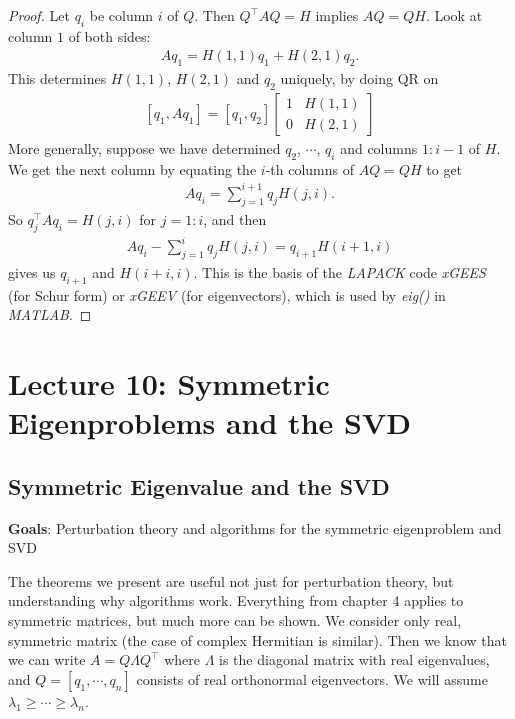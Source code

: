 \documentclass[11pt]{article}
\numberwithin{equation}{section}
\begin{document}
\begin{proof}
    Let $q_i$ be column $i$ of $Q$. Then $Q^{\top}AQ=H$ implies $AQ = QH$. Look at column $1$ of both sides: \begin{align*}
        Aq_1 = H(1,1)q_1 + H(2,1)q_2.
    \end{align*}
    This determines $H(1,1)$, $H(2,1)$ and $q_2$ uniquely, by doing QR on \begin{align*}
        \left[ q_1,Aq_1 \right] = \left[ q_1, q_2 \right] \left[\begin{array}{ll}
            1 & H(1,1) \\
            0 & H(2,1)
            \end{array}\right]
    \end{align*}
    More generally, suppose we have determined $q_2$, $\cdots$, $q_i$ and columns $1:i-1$ of $H$. 
    We get the next column by equating the $i$-th columns of $AQ=QH$ to get \begin{align*}
        Aq_i = \sum_{j=1}^{i+1} q_jH(j,i).
    \end{align*}
    So $q_j^{\top}Aq_i = H(j,i)$ for $j=1:i$, and then \begin{align*}
        Aq_i - \sum_{j=1}^{i} q_jH(j,i) = q_{i+1} H(i+1,i)
    \end{align*}
    gives us $q_{i+1}$ and $H(i+i,i)$. This is the basis of the \textit{LAPACK} code \textit{xGEES} (for Schur form) or \textit{xGEEV} (for eigenvectors), 
    which is used by \textit{eig()} in \textit{MATLAB}.
\end{proof}


\newpage
\section{Lecture 10: Symmetric Eigenproblems and the SVD}
\subsection{Symmetric Eigenvalue and the SVD}
\textbf{Goals}: Perturbation theory and algorithms for the symmetric eigenproblem and SVD

The theorems we present are useful not just for perturbation theory, but understanding why algorithms work. Everything from chapter 4 applies to symmetric matrices, 
but much more can be shown. We consider only real, symmetric matrix (the case of complex Hermitian is similar). 
Then we know that we can write $A=Q\Lambda Q^\top$ where $\Lambda$ is the diagonal matrix with real eigenvalues, and $Q=\left[ q_1, \cdots, q_n \right]$ consists of real orthonormal eigenvectors. 
We will assume $\lambda_1 \geq \cdots \geq \lambda_n$.
\end{document}
